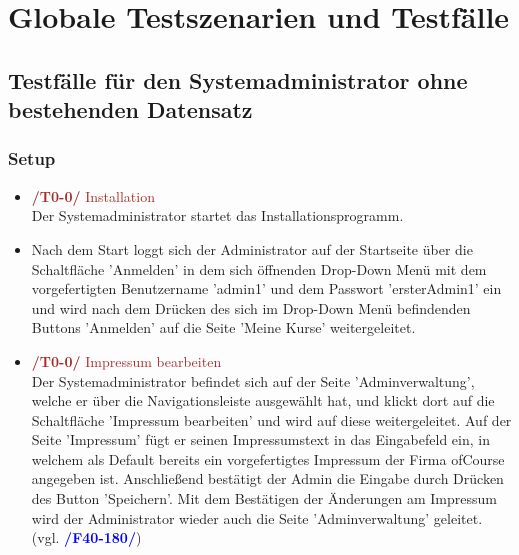 \documentclass[a4paper]{scrreprt}
\newcounter{Lc}
\newcounter{Hc}
\newcommand{\resetAllCounter}{\setcounter{Lc}{0}\setcounter{Hc}{1}}
\begin{document}
\resetAllCounter
\newcommand{\Test}[1]{\stepcounter{Lc}\textcolor{Brown}{\textbf{/T\arabic{Hc}0-\arabic{Lc}0/} #1} \\}
\newcommand{\RefFuncBlue}[1]{\textcolor{Blue}{\textbf{#1}}}
\newcommand{\RefFuncGreen}[1]{\textcolor{Green}{\textbf{#1}}}
\newcommand{\RefFuncBrown}[1]{\textcolor{Brown}{\textbf{#1}}}
\chapter{Globale Testszenarien und Testfälle}
 

	\section{Testfälle für den Systemadministrator ohne bestehenden Datensatz}
		\subsection{Setup}
			\begin{itemize}
				\item \Test{Installation} 
			     Der Systemadministrator startet das Installationsprogramm. 
						
				\item Nach dem Start loggt sich der Administrator auf der Startseite über die Schaltfläche 'Anmelden' in dem sich öffnenden Drop-Down Menü mit dem vorgefertigten Benutzername 'admin1' und dem Passwort 'ersterAdmin1' ein und wird nach dem Drücken des sich im Drop-Down Menü befindenden Buttons 'Anmelden' auf die Seite 'Meine Kurse' weitergeleitet. 
				 
				\item \Test{Impressum bearbeiten}
				 Der Systemadministrator befindet sich auf der Seite 'Adminverwaltung', welche er über die Navigationsleiste ausgewählt hat, und klickt dort auf die Schaltfläche 'Impressum bearbeiten' und wird auf diese weitergeleitet. Auf der Seite 'Impressum' fügt er seinen Impressumstext in das Eingabefeld ein, in welchem als Default bereits ein vorgefertigtes Impressum der Firma ofCourse angegeben ist. Anschließend bestätigt der Admin die Eingabe durch Drücken des Button 'Speichern'. Mit dem Bestätigen der Änderungen am Impressum wird der Administrator wieder auch die Seite 'Adminverwaltung' geleitet. (vgl. \RefFuncBlue{/F40-180/})
				 
				
			\end{itemize}		
				
\end{document}

